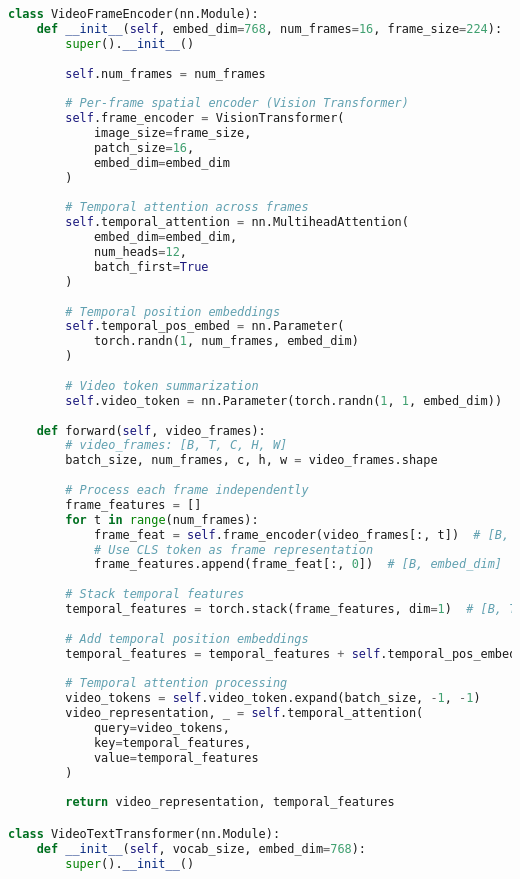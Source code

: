 \begin{lstlisting}[language=Python, caption=Video frame token architecture]
class VideoFrameEncoder(nn.Module):
    def __init__(self, embed_dim=768, num_frames=16, frame_size=224):
        super().__init__()
        
        self.num_frames = num_frames
        
        # Per-frame spatial encoder (Vision Transformer)
        self.frame_encoder = VisionTransformer(
            image_size=frame_size,
            patch_size=16,
            embed_dim=embed_dim
        )
        
        # Temporal attention across frames
        self.temporal_attention = nn.MultiheadAttention(
            embed_dim=embed_dim,
            num_heads=12,
            batch_first=True
        )
        
        # Temporal position embeddings
        self.temporal_pos_embed = nn.Parameter(
            torch.randn(1, num_frames, embed_dim)
        )
        
        # Video token summarization
        self.video_token = nn.Parameter(torch.randn(1, 1, embed_dim))
        
    def forward(self, video_frames):
        # video_frames: [B, T, C, H, W]
        batch_size, num_frames, c, h, w = video_frames.shape
        
        # Process each frame independently
        frame_features = []
        for t in range(num_frames):
            frame_feat = self.frame_encoder(video_frames[:, t])  # [B, num_patches, embed_dim]
            # Use CLS token as frame representation
            frame_features.append(frame_feat[:, 0])  # [B, embed_dim]
        
        # Stack temporal features
        temporal_features = torch.stack(frame_features, dim=1)  # [B, T, embed_dim]
        
        # Add temporal position embeddings
        temporal_features = temporal_features + self.temporal_pos_embed[:, :num_frames]
        
        # Temporal attention processing
        video_tokens = self.video_token.expand(batch_size, -1, -1)
        video_representation, _ = self.temporal_attention(
            query=video_tokens,
            key=temporal_features,
            value=temporal_features
        )
        
        return video_representation, temporal_features

class VideoTextTransformer(nn.Module):
    def __init__(self, vocab_size, embed_dim=768):
        super().__init__()
        

\end{lstlisting}
